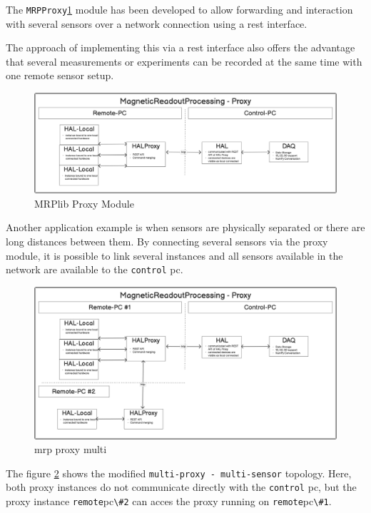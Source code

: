 The \passthrough{\lstinline!MRPProxy!}\ref{MRPlib_Proxy_Module.png}
module has been developed to allow forwarding and interaction with
several sensors over a network connection using a \gls{rest} interface.

The approach of implementing this via a \gls{rest} interface also offers
the advantage that several measurements or experiments can be recorded
at the same time with one remote sensor setup.

\begin{figure}
\centering
\includegraphics{./generated_images/border_MRPlib_Proxy_Module.png}
\caption{MRPlib Proxy Module \label{MRPlib_Proxy_Module.png}}
\end{figure}

Another application example is when sensors are physically separated or
there are long distances between them. By connecting several sensors via
the proxy module, it is possible to link several instances and all
sensors available in the network are available to the
\passthrough{\lstinline!control!} \gls{pc}.

\begin{figure}
\centering
\includegraphics{./generated_images/border_mrp_proxy_multi.png}
\caption{mrp proxy multi \label{mrp_proxy_multi.png}}
\end{figure}

The figure \ref{mrp_proxy_multi.png} shows the modified
\passthrough{\lstinline!multi-proxy - multi-sensor!} topology. Here,
both proxy instances do not communicate directly with the
\passthrough{\lstinline!control!} \gls{pc}, but the proxy instance
\passthrough{\lstinline!remote!}\gls{pc}\passthrough{\lstinline!\#2!}
can acces the proxy running on
\passthrough{\lstinline!remote!}\gls{pc}\passthrough{\lstinline!\#1!}.

